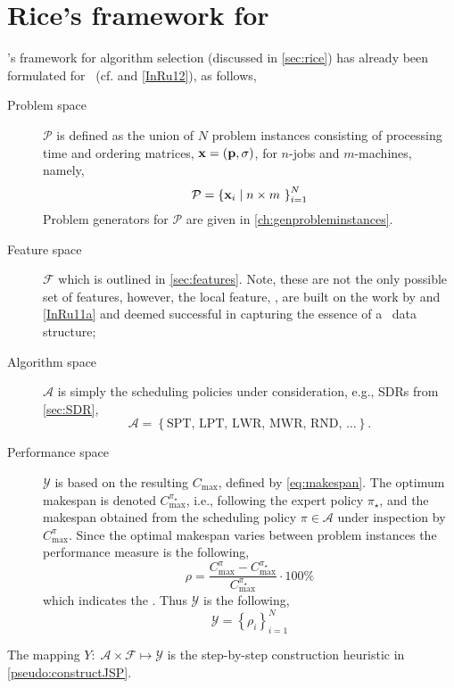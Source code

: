 \section{Rice's framework for \jsp}\label{sec:rice:jsp}
\citeauthor{Rice76}'s framework for algorithm selection (discussed in 
\cref{sec:rice}) has already been formulated for \jsp\ (cf. 
\citet{SmithMilesLion3,SmithMilesLion5} and \cref{InRu12}), as follows, 
\begin{description} 
	\item[Problem space] $\mathcal{P}$ is defined as the union of $N$ problem 
	instances consisting of processing time and ordering matrices, 
	$\mathbf{x}=(\mathbf{p},{\mathbf{\sigma}})$, for $n$-jobs and $m$-machines, namely,
	\begin{equation} 
		\mathcal{P}=\left\{\mathbf{x}_i\;\middle|\;n\times m~\right\}_{i=1}^{N}
	\end{equation}
	Problem generators for $\mathcal{P}$ are given in \cref{ch:genprobleminstances}.
	\item[Feature space] $\mathcal{F}$ which is outlined in 
	\cref{sec:features}. Note, these are not the only possible set of features, 
	however, the local feature, \phiLocalRelated, are built on the work by 
	\cite{SmithMilesLion3} and \cref{InRu11a} and deemed successful in 
	capturing the essence of a \jsp\ data structure;
	\item[Algorithm space] $\mathcal{A}$ is simply the scheduling policies under consideration, e.g., SDRs from \cref{sec:SDR},
	\begin{equation}
		\mathcal{A}=\left\{\text{SPT,~LPT,~LWR,~MWR,~RND,~}\dotsc\right\}.
	\end{equation} 
	\item[Performance space] $\mathcal{Y}$ is based on the resulting 
	$C_{\max}$, defined by \cref{eq:makespan}. The optimum makespan is denoted 
	$C_{\max}^{\pi_\star}$, i.e., following the expert policy $\pi_\star$, and 
	the makespan obtained from the scheduling policy $\pi\in\mathcal{A}$ under 
	inspection by $C_{\max}^{\pi}$. 
    Since the optimal makespan varies between problem instances the performance 
    measure is the following, 
	\begin{equation}\label{eq:rho}
		\rho=\frac{C_{\max}^{\pi}-C_{\max}^{\pi_\star}}{C_{\max}^{\pi_\star}}\cdot
		 100\%
	\end{equation}
	which indicates the \namerho. Thus $\mathcal{Y}$ is the following, 
	\begin{equation}
		\mathcal{Y}=\left\{\rho_i\right\}_{i=1}^{N}
	\end{equation}
\end{description}
The mapping $Y:\;\mathcal{A}\times\mathcal{F} \mapsto \mathcal{Y}$ is the 
step-by-step construction heuristic in \cref{pseudo:constructJSP}.